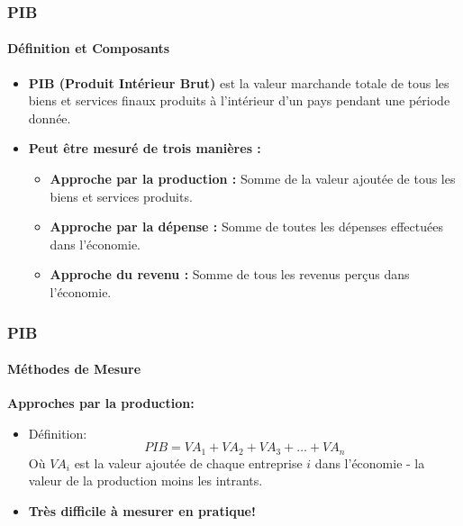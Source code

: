 \documentclass{beamer}
\begin{document}
\begin{frame}
    \frametitle{PIB}
    \framesubtitle{Définition et Composants}
        \begin{itemize}
            \item \textbf{PIB (Produit Intérieur Brut)} est la valeur marchande totale de tous les biens 
            et services finaux produits à l'intérieur d'un pays pendant une période donnée.
            \item \textbf{Peut être mesuré de trois manières :}
            \begin{itemize}
                \item \textbf{Approche par la production :} 
                Somme de la valeur ajoutée de tous les biens et services produits.
                \item \textbf{Approche par la dépense :} 
                Somme de toutes les dépenses effectuées dans l'économie.
                \item \textbf{Approche du revenu :} 
                Somme de tous les revenus perçus dans l'économie.
        \end{itemize}
    \end{itemize}
\end{frame}


\begin{frame}
    \frametitle{PIB}
    \framesubtitle{Méthodes de Mesure}
        \textbf{Approches par la production:}
        \begin{itemize}
            \item Définition:
            \begin{equation}
                PIB = VA_1 + VA_2 + VA_3 + \ldots + VA_n
            \end{equation}
            Où $VA_i$ est la valeur ajoutée de chaque entreprise $i$
            dans l'économie - la valeur de la production moins les intrants.
            \pause
            \item \textbf{ Tr\`es difficile à mesurer en pratique!}
        \end{itemize}
        
\end{frame}
\end{document}
